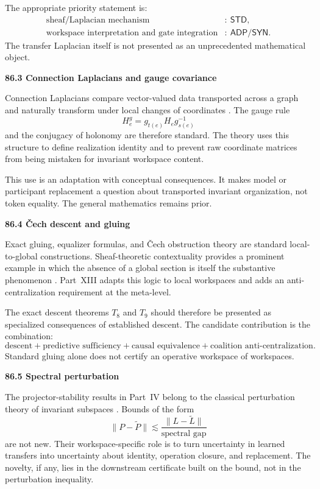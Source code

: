 \documentclass[11pt,letterpaper]{article}
\newcommand{\subtopic}[1]{%
 \vspace{0.45em}
 {\bfseries\color{AccentColor} #1\par}
}
\theoremstyle{plain}
\theoremstyle{definition}
\begin{document}
The appropriate priority statement is:
\[
\begin{aligned}
\text{sheaf/Laplacian mechanism} &:\ \mathsf{STD},\\
\text{workspace interpretation and gate integration} &:\ \mathsf{ADP}/\mathsf{SYN}.
\end{aligned}
\]
The transfer Laplacian itself is not presented as an
unprecedented mathematical object.

\subtopic{86.3 Connection Laplacians and gauge covariance}

Connection Laplacians compare vector-valued data transported across a graph
and naturally transform under local changes of coordinates
\cite{SingerWu2012}. The gauge rule
\[
H_e^g=g_{t(e)}H_eg_{s(e)}^{-1}
\]
and the conjugacy of holonomy are therefore standard. The theory uses
this structure to define realization identity and to prevent raw coordinate
matrices from being mistaken for invariant workspace content.

This use is an adaptation with conceptual consequences. It makes model or
participant replacement a question about transported invariant organization,
not token equality. The general mathematics remains prior.

\subtopic{86.4 \v{C}ech descent and gluing}

Exact gluing, equalizer formulas, and \v{C}ech obstruction theory are standard
local-to-global constructions. Sheaf-theoretic contextuality provides a
prominent example in which the absence of a global section is itself the
substantive phenomenon \cite{AbramskyBrandenburger2011}. Part~XIII adapts this
logic to local workspaces and adds an anti-centralization requirement at the
meta-level.

The exact descent theorems \(T_8\) and \(T_9\) should therefore be presented as
specialized consequences of established descent. The candidate contribution
is the combination:
\[
\text{descent}
+
\text{predictive sufficiency}
+
\text{causal equivalence}
+
\text{coalition anti-centralization}.
\]
Standard gluing alone does not certify an operative workspace of workspaces.

\subtopic{86.5 Spectral perturbation}

The projector-stability results in Part~IV belong to the classical perturbation
theory of invariant subspaces \cite{DavisKahan1970,Kato1995}. Bounds of the
form
\[
\|P-\widetilde P\|
\lesssim
\frac{\|L-\widetilde L\|}{\text{spectral gap}}
\]
are not new. Their workspace-specific role is to turn uncertainty in learned
transfers into uncertainty about identity, operation closure, and replacement.
The novelty, if any, lies in the downstream certificate built on the bound, not
in the perturbation inequality.
\end{document}
